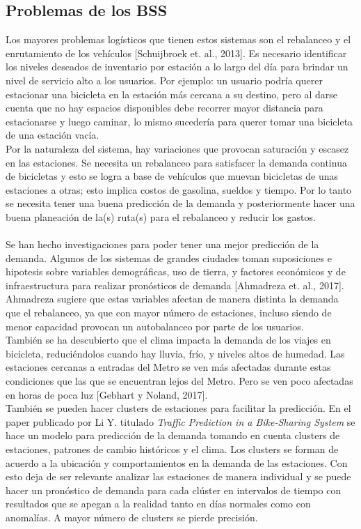 \documentclass[12pt,spanish]{article}
\begin{document}
 	\subsection{Problemas de los BSS}
 	Los mayores problemas logísticos que tienen estos sistemas son el rebalanceo y el enrutamiento de los vehículos [Schuijbroek et. al., 2013]. Es necesario identificar los niveles deseados de inventario por estación a lo largo del día para brindar un nivel de servicio alto a los usuarios. Por ejemplo: un usuario podría querer estacionar una bicicleta en la estación más cercana a su destino, pero al darse cuenta que no hay espacios disponibles debe recorrer mayor distancia para estacionarse y luego caminar, lo mismo sucedería para querer tomar una bicicleta de una estación vacía.\\
 	Por la naturaleza del sistema, hay variaciones que provocan saturación y escasez en las estaciones. Se necesita un rebalanceo para satisfacer la demanda continua de bicicletas y esto se logra a base de vehículos que muevan bicicletas de unas estaciones a otras; esto implica costos de gasolina, sueldos y tiempo. Por lo tanto se necesita tener una buena predicción de la demanda y posteriormente hacer una buena planeación de la(s) ruta(s) para el rebalanceo y reducir los gastos.\\\\
 	Se han hecho investigaciones para poder tener una mejor predicción de la demanda. Algunos de los sistemas de grandes ciudades toman suposiciones e hipotesis sobre variables demográficas, uso de tierra, y factores económicos y de infraestructura para realizar pronósticos de demanda [Ahmadreza et. al., 2017]. Ahmadreza sugiere que estas variables afectan de manera distinta la demanda que el rebalanceo, ya que con mayor número de estaciones, incluso siendo de menor capacidad provocan un autobalanceo por parte de los usuarios.\\
 	También se ha descubierto que el clima impacta la demanda de los viajes en bicicleta, reduciéndolos cuando hay lluvia, frío, y niveles altos de humedad. Las estaciones cercanas a entradas del Metro se ven más afectadas durante estas condiciones que las que se encuentran lejos del Metro. Pero se ven poco afectadas en horas de poca luz [Gebhart y Noland, 2017].\\
 	También se pueden hacer clusters de estaciones para facilitar la predicción. En el paper publicado por Li Y. titulado \textit{Traffic Prediction in a Bike-Sharing System} se hace un modelo para predicción de la demanda tomando en cuenta clusters de estaciones, patrones de cambio históricos y el clima. Los clusters se forman de acuerdo a la ubicación y comportamientos en la demanda de las estaciones. Con esto deja de ser relevante analizar las estaciones de manera individual y se puede hacer un pronóstico de demanda para cada clúster en intervalos de tiempo con resultados que se apegan a la realidad tanto en días normales como con anomalías. A mayor número de clusters se pierde precisión.\\
\end{document}
